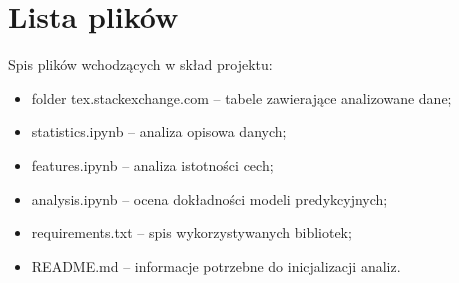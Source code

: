 \documentclass[12pt]{article}
\begin{document}
	\section{Lista plików}\label{sec:lista-plikow}
	Spis plików wchodzących w skład projektu:
	\begin{itemize}
		\item folder tex.stackexchange.com -- tabele zawierające analizowane dane;
		\item statistics.ipynb -- analiza opisowa danych;
		\item features.ipynb -- analiza istotności cech;
		\item analysis.ipynb -- ocena dokładności modeli predykcyjnych;
		\item requirements.txt -- spis wykorzystywanych bibliotek;
		\item README.md -- informacje potrzebne do inicjalizacji analiz.
	\end{itemize}
	
\end{document}
